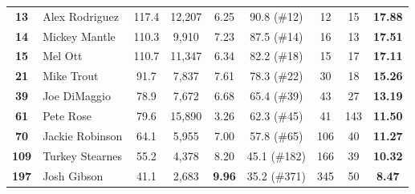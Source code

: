 \documentclass[11pt,letterpaper]{article}
\theoremstyle{plain}
\theoremstyle{definition}
\theoremstyle{remark}
\begin{document}
\begin{table}[htbp]
{\begin{tabular}{@{}clccccccc@{}}
\textbf{13} & Alex Rodriguez & 117.4 & 12,207 & 6.25 & 90.8 (\#12) & 12 & 15 & \textbf{17.88} \\
\textbf{14} & Mickey Mantle & 110.3 & 9,910 & 7.23 & 87.5 (\#14) & 16 & 13 & \textbf{17.51} \\
\textbf{15} & Mel Ott & 110.7 & 11,347 & 6.34 & 82.2 (\#18) & 15 & 17 & \textbf{17.11} \\
\midrule
\textbf{21} & Mike Trout & 91.7 & 7,837 & 7.61 & 78.3 (\#22) & 30 & 18 & \textbf{15.26} \\
\textbf{39} & Joe DiMaggio & 78.9 & 7,672 & 6.68 & 65.4 (\#39) & 43 & 27 & \textbf{13.19} \\
\textbf{61} & Pete Rose & 79.6 & 15,890 & 3.26 & 62.3 (\#45) & 41 & 143 & \textbf{11.50} \\
\textbf{70} & Jackie Robinson & 64.1 & 5,955 & 7.00 & 57.8 (\#65) & 106 & 40 & \textbf{11.27} \\
\textbf{109} & Turkey Stearnes & 55.2 & 4,378 & 8.20 & 45.1 (\#182) & 166 & 39 & \textbf{10.32} \\
\textbf{197} & Josh Gibson & 41.1 & 2,683 & \textbf{9.96} & 35.2 (\#371) & 345 & 50 & \textbf{8.47} \\
\bottomrule
\end{tabular}%
}
\end{table}
\end{document}
